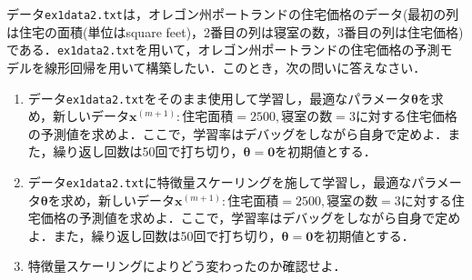 \begin{qu}\label{qu_lr2_1}
データ\texttt{ex1data2.txt}は，オレゴン州ポートランドの住宅価格のデータ(最初の列は住宅の面積(単位はsquare feet)，2番目の列は寝室の数，3番目の列は住宅価格)である．\texttt{ex1data2.txt}を用いて，オレゴン州ポートランドの住宅価格の予測モデルを線形回帰を用いて構築したい．このとき，次の問いに答えなさい．
\begin{enumerate}
\item データ\texttt{ex1data2.txt}をそのまま使用して学習し，最適なパラメータ${\bm \theta}$を求め，新しいデータ${\bm x}^{(m+1)}:住宅面積=2500, 寝室の数=3$に対する住宅価格の予測値を求めよ．ここで，学習率はデバッグをしながら自身で定めよ．また，繰り返し回数は50回で打ち切り，${\bm \theta}={\bm 0}$を初期値とする．
\item データ\texttt{ex1data2.txt}に特徴量スケーリングを施して学習し，最適なパラメータ${\bm \theta}$を求め，新しいデータ${\bm x}^{(m+1)}:住宅面積=2500, 寝室の数=3$に対する住宅価格の予測値を求めよ．ここで，学習率はデバッグをしながら自身で定めよ．また，繰り返し回数は50回で打ち切り，${\bm \theta}={\bm 0}$を初期値とする．
\item 特徴量スケーリングによりどう変わったのか確認せよ．
\end{enumerate}
\end{qu}
